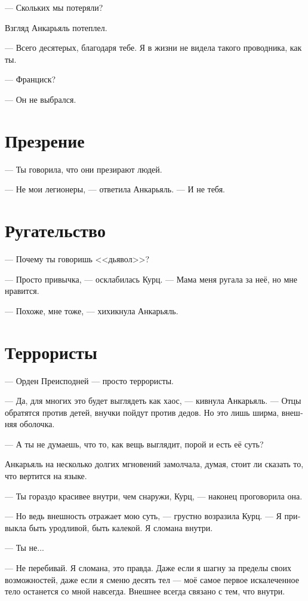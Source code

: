 \documentclass[a4paper,10pt,fleqn]{book}\usepackage{polyglossia}\setdefaultlanguage[babelshorthands=true]{russian}\setotherlanguage{english}\defaultfontfeatures{Ligatures=TeX,Mapping=tex-text}\usepackage{xcolor}\newcommand{\ml}[3]{#2}
\begin{document}
--- Скольких мы потеряли?

Взгляд Анкарьяль потеплел.

--- Всего десятерых, благодаря тебе.
Я в жизни не видела такого проводника, как ты.

--- Франциск?

\ml{$0$}
{--- Он не выбрался.}
{``He didn't make it.''}

\section{Презрение}

--- Ты говорила, что они презирают людей.

--- Не мои легионеры, --- ответила Анкарьяль.
--- И не тебя.

\section{Ругательство}

--- Почему ты говоришь <<дьявол>>?

--- Просто привычка, --- осклабилась Курц.
--- Мама меня ругала за неё, но мне нравится.

--- Похоже, мне тоже, --- хихикнула Анкарьяль.

\section{Террористы}

--- Орден Преисподней --- просто террористы.

--- Да, для многих это будет выглядеть как хаос, --- кивнула Анкарьяль.
--- Отцы обратятся против детей, внучки пойдут против дедов.
Но это лишь ширма, внешняя оболочка.

--- А ты не думаешь, что то, как вещь выглядит, порой и есть её суть?

Анкарьяль на несколько долгих мгновений замолчала, думая, стоит ли сказать то, что вертится на языке.

--- Ты гораздо красивее внутри, чем снаружи, Курц, --- наконец проговорила она.

--- Но ведь внешность отражает мою суть, --- грустно возразила Курц.
--- Я привыкла быть уродливой, быть калекой.
Я сломана внутри.

--- Ты не...

--- Не перебивай.
Я сломана, это правда.
Даже если я шагну за пределы своих возможностей, даже если я сменю десять тел --- моё самое первое искалеченное тело останется со мной навсегда.
Внешнее всегда связано с тем, что внутри.
\end{document}
